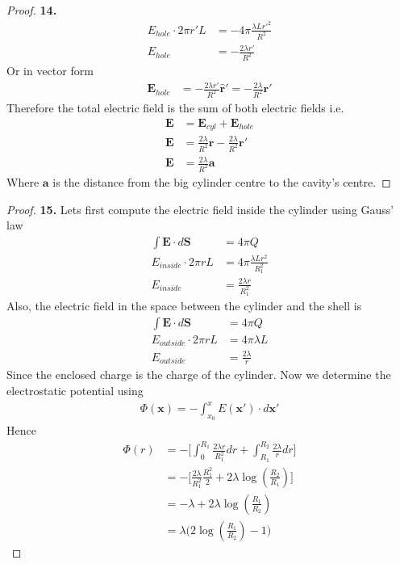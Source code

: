 \documentclass[11pt]{article}
\newcommand{\hatr}{\bm{\hat{r}}}
\theoremstyle{definition}
\begin{document}
\begin{proof}{\textbf{14.}}
\begin{align*}
        E_{hole} \cdot 2\pi r' L&= -4\pi \frac{\lambda L r'^2}{R^2}\\
        E_{hole} &= -\frac{2\lambda r'}{R^2}
    \end{align*}
    Or in vector form
    \begin{align*}
        \bm E_{hole} &= -\frac{2\lambda r'}{R^2} \hatr' = -\frac{2\lambda}{R^2} \bm{r'}
    \end{align*}
    Therefore the total electric field is the sum of both electric fields i.e. 
    \begin{align*}
        \bm E &= \bm E_{cyl} + \bm E_{hole}\\
        \bm E &= \frac{2\lambda}{R^2} \bm{r} - \frac{2\lambda}{R^2} \bm{r'}\\
        \bm E &= \frac{2\lambda}{R^2} \bm{a}        
    \end{align*}
    Where $\bm{a}$ is the distance from the big cylinder centre to the cavity's
    centre.
\end{proof}
\cleardoublepage
\begin{proof}{\textbf{15.}}
    Lets first compute the electric field inside the cylinder using Gauss'
    law
    \begin{align*}
        \int \bm{E}\cdot d\bm{S} &= 4\pi Q\\
        E_{inside} \cdot 2\pi r L &= 4\pi \frac{\lambda Lr^2}{R_1^2}\\
        E_{inside} &= \frac{2\lambda r}{R_1^2}
    \end{align*}
    Also, the electric field in the space between the cylinder and the shell is 
    \begin{align*}
        \int \bm{E}\cdot d\bm{S} &= 4\pi Q\\
        E_{outside} \cdot 2\pi r L &= 4\pi \lambda L\\
        E_{outside} &= \frac{2\lambda}{r}
    \end{align*} 
    Since the enclosed charge is the charge of the cylinder.  
    Now we determine the electrostatic potential using
    \begin{align*}
        \Phi(\bm{x}) = - \int_{x_0}^x E(\bm{x}')\cdot d\bm{x}'
    \end{align*}
    Hence
    \begin{align*}
        \Phi(r)
        &= -\bigg[\int_{0}^{R_1} \frac{2\lambda r}{R_1^2} dr
        + \int_{R_1}^{R_2} \frac{2\lambda}{r} dr \bigg] \\
        &= -\bigg[\frac{2\lambda}{R_1^2}\frac{R_1^2}{2}
        + 2\lambda\log(\frac{R_2}{R_1}) \bigg] \\
        &= -\lambda + 2\lambda\log(\frac{R_1}{R_2})\\
        &= \lambda \bigg(2\log(\frac{R_1}{R_2}) - 1\bigg)
    \end{align*}
\end{proof}
\end{document}

